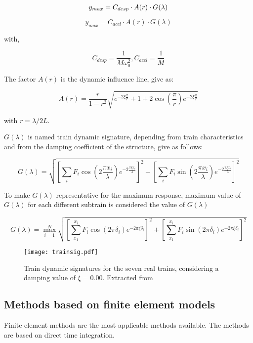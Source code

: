 \begin{equation}
	\centering
	y_{max}=C_{desp}\cdot A(r) \cdot G(\lambda)
\end{equation}

\begin{equation}
	\ddot{y}_{max}=C_{acel}\cdot A(r) \cdot G(\lambda)
\end{equation}

with,

\begin{equation}
	C_{desp} = \frac{1}{M\omega_0^2},
	C_{acel} = \frac{1}{M}
\end{equation}

The factor $ A(r) $ is the dynamic influence line, give as:

\begin{equation}
	A(r)=\frac{r}{1-r^2}\sqrt{e^{-2\xi \frac{\pi}{r}}+1+2\cos (\frac{\pi}{r})e^{-2\xi \frac{\pi}{r}}}
\end{equation}

with $ r=\lambda/2L $.

$G(\lambda)$ is named train dynamic signature, depending from train characteristics and from the damping coefficient of the structure, give as follows:

\begin{equation}
	G(\lambda)=\sqrt{[\sum_i F_i \cos (2 \frac{\pi x_i}{\lambda})e^{-2\frac{\pi \xi x_i}{\lambda}}]^2+[\sum_i F_i\sin (2 \frac{\pi x_i}{\lambda})e^{-2\frac{\pi \xi x_i}{\lambda}}]^2}
\end{equation}

To make $G(\lambda)$ representative for the maximum response, maximum value of $G(\lambda)$ for each different subtrain is considered the value of $G(\lambda)$

\begin{equation}
	G(\lambda) = \max_{i=1}^{N} \sqrt{[\sum_{x_1}^{x_i}F_i\cos (2\pi \delta_i) e^{-2\pi \xi \delta_i}]^2+[\sum_{x_1}^{x_i}F_i \sin (2\pi \delta_i) e^{-2\pi \xi \delta_i}]^2}
\end{equation}

\begin{figure}[h]
	\centering
	\texttt{[image: trainsig.pdf]}
	\caption{Train dynamic signatures for the seven real trains, considering a damping value of $\xi = 0.00$. Extracted from \cite[Figure 2.20]{da2007dynamic}}
	\label{trainsig}
\end{figure}

\subsection{Methods based on finite element models}
Finite element methods are the most applicable methods available. The methods are based on direct time integration.

